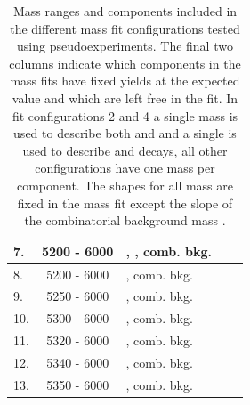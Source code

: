 \begin{table}[h!]
\begin{center}
\begin{tabular}{lclcc}
7.			& 5200 - 6000 			& \bsmumu, \bdmumu, comb. bkg.			&  \checked &   \\ \midrule
8.			& 5200 - 6000 			& \bsmumu, comb. bkg.				& \checked &   \\ \midrule
9.			& 5250 - 6000 			& \bsmumu, comb. bkg.				&    \checked & \\ \midrule
10.			& 5300 - 6000 			& \bsmumu, comb. bkg.				&  \checked &  \\ \midrule
11.			& 5320 - 6000 			& \bsmumu, comb. bkg.				&  \checked &  \\ \midrule
12.			& 5340 - 6000 			& \bsmumu, comb. bkg.				&  \checked &  \\ \midrule
13.			& 5350 - 6000 			& \bsmumu, comb. bkg.				&  \checked &  \\ \bottomrule \bottomrule
  
\end{tabular}
\vspace{0.7cm}
\caption{Mass ranges and components included in the different mass fit configurations tested using pseudoexperiments. The final two columns indicate which components in the mass fits have fixed yields at the expected value and which are left free in the fit. In fit configurations 2 and 4 a single mass \pdf is used to describe both \bdpimunu and \bsKmunu and a single \pdf is used to describe \bupimumu and \bdpimumu decays, all other configurations have one mass \pdf per component. The shapes for all mass \pdfs are fixed in the mass fit except the slope of the combinatorial background mass \pdf.}                                                                                                  
\label{tab:toyconfig}
\end{center}
\end{table}



